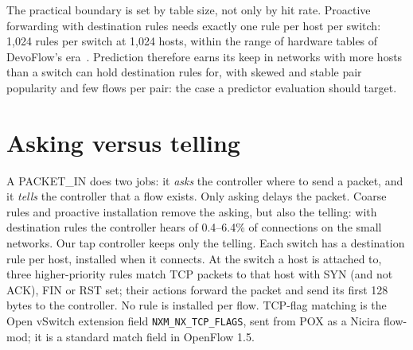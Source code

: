 \documentclass[conference]{IEEEtran}
\begin{document}
The practical boundary is set by table size, not only by hit rate. Proactive forwarding with destination rules needs exactly one rule per host per switch: 1,024 rules per switch at 1,024 hosts, within the range of hardware tables of DevoFlow's era~\cite{devoflow}. Prediction therefore earns its keep in networks with more hosts than a switch can hold destination rules for, with skewed and stable pair popularity and few flows per pair: the case a predictor evaluation should target.

\section{Asking versus telling}\label{sec:tap}

A PACKET\_IN does two jobs: it \emph{asks} the controller where to send a packet, and it \emph{tells} the controller that a flow exists. Only asking delays the packet. Coarse rules and proactive installation remove the asking, but also the telling: with destination rules the controller hears of 0.4--6.4\% of connections on the small networks. Our tap controller keeps only the telling. Each switch has a destination rule per host, installed when it connects. At the switch a host is attached to, three higher-priority rules match TCP packets to that host with SYN (and not ACK), FIN or RST set; their actions forward the packet and send its first 128 bytes to the controller. No rule is installed per flow. TCP-flag matching is the Open vSwitch extension field \texttt{NXM\_NX\_TCP\_FLAGS}, sent from POX as a Nicira flow-mod; it is a standard match field in OpenFlow 1.5.
\end{document}
